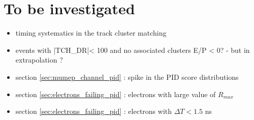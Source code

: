 

\section{To be investigated} 


\begin{itemize}
\item 
  timing systematics in the track cluster matching
\item 
  events with |TCH\_DR|< 100 and no associated clusters E/P < 0? - but in extrapolation ?
\item
  section \ref{sec:mumep_channel_pid} : spike in the PID score distributions
\item
  section \ref{sec:electrons_failing_pid} : electrons with large value of $R_{max}$
\item
  section \ref{sec:electrons_failing_pid} : electrons with $\Delta{T} < 1.5$ ns
\end{itemize}
